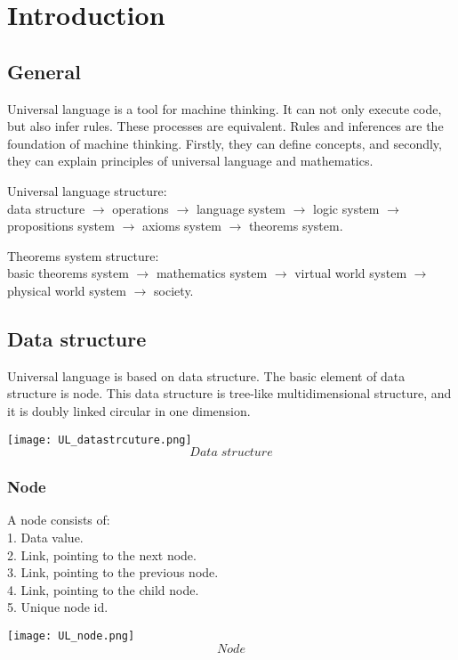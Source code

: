 \chapter{Introduction}

\section{General }
Universal language is a tool for machine thinking. It can not only execute code, but also infer rules. These processes are equivalent. Rules and inferences are the foundation of machine thinking. Firstly, they can define concepts, and secondly, they can explain principles of universal language and mathematics. 

Universal language structure: \\
data structure \(\rightarrow\) operations \(\rightarrow\) language system \(\rightarrow\) logic system \(\rightarrow\) propositions system \(\rightarrow\) axioms system \(\rightarrow\) theorems system.

Theorems system structure: \\
basic theorems system \(\rightarrow\) mathematics system \(\rightarrow\) virtual world system \(\rightarrow\) physical world system \(\rightarrow\) society.


\bigskip
\bigskip
\section{Data structure}
Universal language is based on data structure. The basic element of data structure is node. This data structure is tree-like multidimensional structure, and it is doubly linked circular in one dimension.   


\texttt{[image: UL\_datastrcuture.png]}
\[Data  \; structure\]


\subsection{Node}
A node consists of:\\
1.	Data value.\\
2.	Link, pointing to the next node.\\
3.	Link, pointing to the previous node.\\
4.	Link, pointing to the child node.\\
5.	Unique node id.

\texttt{[image: UL\_node.png]}
\[Node\]




